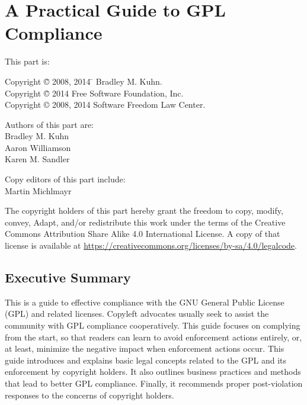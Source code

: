 
\part{A Practical Guide to GPL Compliance}
\label{gpl-compliance-guide}

{\parindent 0in
This part is: \\
\begin{tabbing}
Copyright \= \copyright{} 2008, 2014 \= \hspace{.2in} Bradley M. Kuhn. \\
Copyright \= \copyright{} 2014 \> \hspace{.2in} Free Software Foundation, Inc. \\
Copyright \> \copyright{} 2008, 2014 \> \hspace{.2in} Software Freedom Law Center. \\
\end{tabbing}

\vspace{1in}

\begin{center}
Authors of this part are: \\

Bradley M. Kuhn \\
Aaron Williamson \\
Karen M. Sandler \\

\vspace{1in}

Copy editors of this part include: \\
Martin Michlmayr

\vspace{3in}

The copyright holders of this part hereby grant the freedom to copy, modify,
convey, Adapt, and/or redistribute this work under the terms of the Creative
Commons Attribution Share Alike 4.0 International License.  A copy of that
license is available at
\url{https://creativecommons.org/licenses/by-sa/4.0/legalcode}.
\end{center}
}

\bigskip

\chapter*{Executive Summary}

This is a guide to effective compliance with the GNU General Public
License (GPL) and related licenses.  Copyleft advocates
usually seek to assist the community with
GPL compliance cooperatively.   This guide focuses on complying from the
start, so that readers can learn to avoid enforcement actions entirely, or, at
least, minimize  the negative impact when enforcement actions occur.
This guide  introduces and explains basic legal concepts related to the GPL and its
enforcement by copyright holders. It also outlines business practices and
methods that lead to better GPL compliance.  Finally, it recommends proper
post-violation responses to the concerns of copyright holders.

